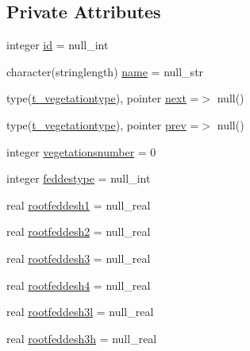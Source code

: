 \subsection*{Private Attributes}
\begin{DoxyCompactItemize}
\item 
integer \mbox{\hyperlink{structmodulevegetation_1_1t__vegetationtype_a924839e550b041cc20b81bd1e21cb748}{id}} = null\+\_\+int
\item 
character(stringlength) \mbox{\hyperlink{structmodulevegetation_1_1t__vegetationtype_adb11826a4979cf1bd0bb260c066e6bb9}{name}} = null\+\_\+str
\item 
type(\mbox{\hyperlink{structmodulevegetation_1_1t__vegetationtype}{t\+\_\+vegetationtype}}), pointer \mbox{\hyperlink{structmodulevegetation_1_1t__vegetationtype_ae540d87db09ae399252649ed69fabba1}{next}} =$>$ null()
\item 
type(\mbox{\hyperlink{structmodulevegetation_1_1t__vegetationtype}{t\+\_\+vegetationtype}}), pointer \mbox{\hyperlink{structmodulevegetation_1_1t__vegetationtype_a0bbb5cff5cf03a71142f86b24f65c198}{prev}} =$>$ null()
\item 
integer \mbox{\hyperlink{structmodulevegetation_1_1t__vegetationtype_aa1ae344f90b48457e7e7fa19b074532e}{vegetationsnumber}} = 0
\item 
integer \mbox{\hyperlink{structmodulevegetation_1_1t__vegetationtype_a8335f105a5ba5ef5faeea0644c23a1dd}{feddestype}} = null\+\_\+int
\item 
real \mbox{\hyperlink{structmodulevegetation_1_1t__vegetationtype_a56ef1b620b43ac581bd8cfcd4d98dca1}{rootfeddesh1}} = null\+\_\+real
\item 
real \mbox{\hyperlink{structmodulevegetation_1_1t__vegetationtype_a9fa3705159d2d0e1504894e961ee7e90}{rootfeddesh2}} = null\+\_\+real
\item 
real \mbox{\hyperlink{structmodulevegetation_1_1t__vegetationtype_a20565716c3d226a89052ef74943461f7}{rootfeddesh3}} = null\+\_\+real
\item 
real \mbox{\hyperlink{structmodulevegetation_1_1t__vegetationtype_a8d870b51b0e96d6146abb3b6bde6e006}{rootfeddesh4}} = null\+\_\+real
\item 
real \mbox{\hyperlink{structmodulevegetation_1_1t__vegetationtype_a3ab64add4a8e9693184c9ce3332e1a7c}{rootfeddesh3l}} = null\+\_\+real
\item 
real \mbox{\hyperlink{structmodulevegetation_1_1t__vegetationtype_a68c7bc5fc41855de663ad20af5052ecf}{rootfeddesh3h}} = null\+\_\+real
\item 

\end{DoxyCompactItemize}
